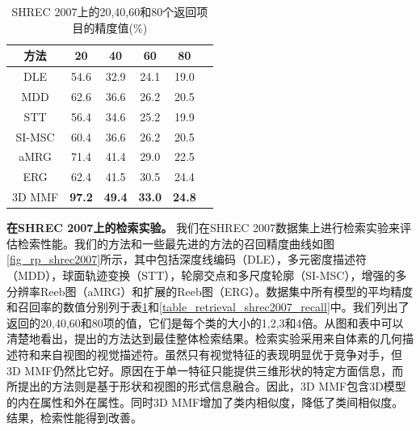 \begin{table}[tbhp]

\caption{SHREC 2007上的20,40,60和80个返回项目的精度值(\%)} \label{table_retrieval_shrec2007_precision}
\begin{center}
\begin{tabular}{cccccc}  %
\hline  \hline
方法 			    &20     &40     &60     &80   \\ 
\hline
DLE \cite{giorgi2007watertight}   &54.6  &32.9  &24.1  &19.0   \\ 
MDD \cite{giorgi2007watertight}      &62.6  &36.6  &26.2  &20.5  \\
STT \cite{giorgi2007watertight}      &56.4  &34.6  &25.2  &19.9  \\
SI-MSC \cite{giorgi2007watertight}      &60.4  &36.6  &26.2  &20.5  \\
aMRG \cite{giorgi2007watertight}      &71.4  &41.4  &29.0  &22.5  \\
ERG \cite{barra20133d}      &62.4  &41.5  &30.5  &24.4  \\
3D MMF   &\textbf{97.2} &\textbf{49.4} &\textbf{33.0} &\textbf{24.8} \\  
\hline  \hline      %
\end{tabular}
\end{center} 
\end{table}


\textbf{在SHREC 2007上的检索实验。} 我们在SHREC 2007数据集上进行检索实验来评估检索性能。我们的方法和一些最先进的方法的召回精度曲线如图\ref{fig_rp_shrec2007}所示，其中包括深度线编码（DLE）\cite{Giorgi2008SHape}，多元密度描述符（MDD）\cite{Giorgi2008SHape}，球面轨迹变换（STT）\cite{Giorgi2008SHape}，轮廓交点和多尺度轮廓（SI-MSC）\cite{Giorgi2008SHape}，增强的多分辨率Reeb图（aMRG）\cite{Giorgi2008SHape}和扩展的Reeb图（ERG）\cite{barra20133d}。数据集中所有模型的平均精度和召回率的数值分别列于表\ref {table_retrieval_shrec2007_precision}和\ref{table_retrieval_shrec2007_recall}中。我们列出了返回的20,40,60和80项的值，它们是每个类的大小的1,2,3和4倍。从图和表中可以清楚地看出，提出的方法达到最佳整体检索结果。检索实验采用来自体素的几何描述符和来自视图的视觉描述符。虽然只有视觉特征的表现明显优于竞争对手，但3D MMF仍然比它好。原因在于单一特征只能提供三维形状的特定方面信息，而所提出的方法则是基于形状和视图的形式信息融合。因此，3D MMF包含3D模型的内在属性和外在属性。同时3D MMF增加了类内相似度，降低了类间相似度。结果，检索性能得到改善。

